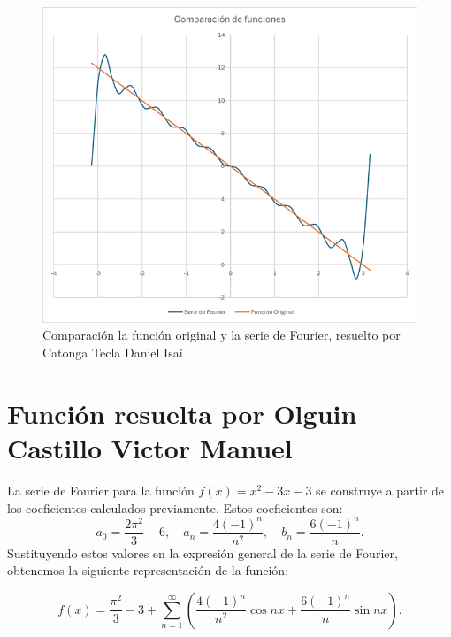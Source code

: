 {\begin{minipage}{\textwidth}
    \begin{figure}[H]
    \centering
        \includegraphics[width=0.9\linewidth, height=0.3\textheight]{Figures/fourierDaniel/Comparacion.png}
        \caption[Comparación entre la función original y la serie de Fourier]{Comparación la función original y la serie de Fourier, resuelto por Catonga Tecla Daniel Isaí}
        \label{fig:figure-danielexcel-03}
    \end{figure}
    
\end{minipage}

\section{Función resuelta por Olguin Castillo Victor Manuel}
\label{sec:class-options}

La serie de Fourier para la función \( f(x) = x^2 - 3x - 3 \) se construye a partir de los coeficientes calculados previamente. Estos coeficientes son: 
\[
a_0 = \frac{2\pi^2}{3} - 6, \quad a_n = \frac{4(-1)^n}{n^2}, \quad b_n = \frac{6(-1)^n}{n}.
\]
Sustituyendo estos valores en la expresión general de la serie de Fourier, obtenemos la siguiente representación de la función:

\begin{equation}
\label{eq:serieFourier-x2-3x-3}
f(x) = \frac{\pi^2}{3} - 3 + \sum_{n=1}^{\infty} \left( \frac{4(-1)^n}{n^2} \cos{nx} + \frac{6(-1)^n}{n} \sin{nx} \right).
\end{equation}

}
